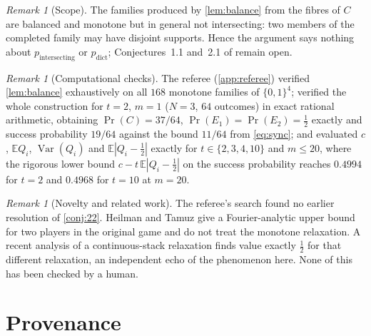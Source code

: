 \documentclass[11pt,a4paper]{article}
\theoremstyle{plain}
\theoremstyle{definition}
\theoremstyle{remark}
\newtheorem{remark}[theorem]{Remark}
\newcommand{\E}{\mathbb E}
\newcommand{\Prob}{\Pr}
\DeclareMathOperator{\Var}{Var}
\newcommand{\pint}{p_{\mathrm{intersecting}}}
\newcommand{\pdict}{p_{\mathrm{dict}}}
\begin{document}
\begin{remark}[Scope]\label{rem:scope}
The families produced by \cref{lem:balance} from the fibres of $C$ are balanced and monotone but in general not intersecting: two members of the completed family may have disjoint supports. Hence the argument says nothing about $\pint$ or $\pdict$; Conjectures~1.1 and~2.1 of \cite{AFKK} remain open.
\end{remark}

\begin{remark}[Computational checks]
The referee (\cref{app:referee}) verified \cref{lem:balance} exhaustively on all $168$ monotone families of $\{0,1\}^4$; verified the whole construction for $t=2$, $m=1$ ($N=3$, $64$ outcomes) in exact rational arithmetic, obtaining $\Prob(C)=37/64$, $\Prob(E_1)=\Prob(E_2)=\frac12$ exactly and success probability $19/64$ against the bound $11/64$ from \eqref{eq:sync}; and evaluated $c$, $\E Q_i$, $\Var(Q_i)$ and $\E|Q_i-\frac12|$ exactly for $t\in\{2,3,4,10\}$ and $m\le20$, where the rigorous lower bound $c-t\,\E|Q_i-\frac12|$ on the success probability reaches $0.4994$ for $t=2$ and $0.4968$ for $t=10$ at $m=20$.
\end{remark}

\begin{remark}[Novelty and related work]
The referee's search found no earlier resolution of \cref{conj:22}. Heilman and Tamuz \cite{HT25} give a Fourier-analytic upper bound for two players in the original game and do not treat the monotone relaxation. A recent analysis of a continuous-stack relaxation \cite{Cont25} finds value exactly $\frac12$ for that different relaxation, an independent echo of the phenomenon here. None of this has been checked by a human.
\end{remark}

\section{Provenance}\label{sec:provenance}
\end{document}

